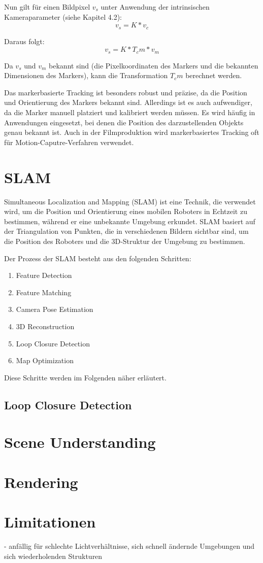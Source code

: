 Nun gilt für einen Bildpixel \(v_s\) unter Anwendung der intrinsischen Kameraparameter (siehe Kapitel 4.2):
\[ v_s = K * v_c \]

Daraus folgt:
\[ v_s = K * T_cm * v_m \]

Da \(v_s\) und \(v_m\) bekannt sind (die Pixelkoordinaten des Markers und die bekannten Dimensionen des Markers), kann die Transformation \(T_cm\) berechnet werden.

Das markerbasierte Tracking ist besonders robust und präzise, da die Position und Orientierung des Markers bekannt sind. Allerdings ist es auch aufwendiger, da die Marker manuell platziert und kalibriert werden müssen. Es wird häufig in Anwendungen eingesetzt, bei denen die Position des darzustellenden Objekts genau bekannt ist. Auch in der Filmproduktion wird markerbasiertes Tracking oft für Motion-Caputre-Verfahren verwendet.

\section{SLAM}

Simultaneous Localization and Mapping (SLAM) ist eine Technik, die verwendet wird, um die Position und Orientierung eines mobilen Roboters in Echtzeit zu bestimmen, während er eine unbekannte Umgebung erkundet. SLAM basiert auf der Triangulation von Punkten, die in verschiedenen Bildern sichtbar sind, um die Position des Roboters und die 3D-Struktur der Umgebung zu bestimmen.

Der Prozess der SLAM besteht aus den folgenden Schritten:

\begin{enumerate}
    \item Feature Detection
    \item Feature Matching
    \item Camera Pose Estimation
    \item 3D Reconstruction
    \item Loop Closure Detection
    \item Map Optimization
\end{enumerate}

Diese Schritte werden im Folgenden näher erläutert.

\subsection{Loop Closure Detection}

\section{Scene Understanding}

\section{Rendering}

\section{Limitationen}
- anfällig für schlechte Lichtverhältnisse, sich schnell ändernde Umgebungen und sich wiederholenden Strukturen



